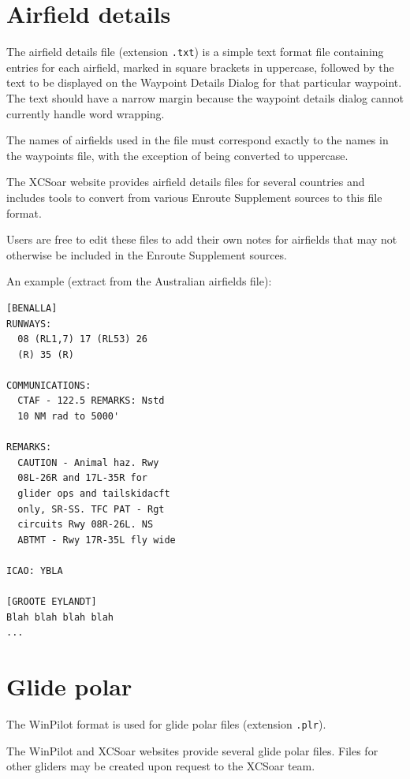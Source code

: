 \documentclass[a4paper,12pt]{refrep}
\begin{document}
\section{Airfield details}

The airfield details file (extension \verb|.txt|) is a simple text
format file containing entries for each airfield, marked in square
brackets in uppercase, followed by the text to be displayed on the
Waypoint Details Dialog for that particular waypoint.  The text should
have a narrow margin because the waypoint details dialog cannot
currently handle word wrapping.

The names of airfields used in the file must correspond exactly to the
names in the waypoints file, with the exception of being converted to
uppercase.

The XCSoar website provides airfield details files for several
countries and includes tools to convert from various Enroute
Supplement sources to this file format.

Users are free to edit these files to add their own notes for
airfields that may not otherwise be included in the Enroute Supplement
sources.

An example (extract from the Australian airfields file):
\begin{verbatim}
[BENALLA]
RUNWAYS:
  08 (RL1,7) 17 (RL53) 26
  (R) 35 (R)

COMMUNICATIONS:
  CTAF - 122.5 REMARKS: Nstd
  10 NM rad to 5000'

REMARKS:
  CAUTION - Animal haz. Rwy
  08L-26R and 17L-35R for
  glider ops and tailskidacft
  only, SR-SS. TFC PAT - Rgt
  circuits Rwy 08R-26L. NS
  ABTMT - Rwy 17R-35L fly wide

ICAO: YBLA

[GROOTE EYLANDT]
Blah blah blah blah
...
\end{verbatim}

\section{Glide polar}

The WinPilot format is used for glide polar files (extension \verb|.plr|).

The WinPilot and XCSoar websites provide several glide polar files.
Files for other gliders may be created upon request to the XCSoar
team.
\end{document}
